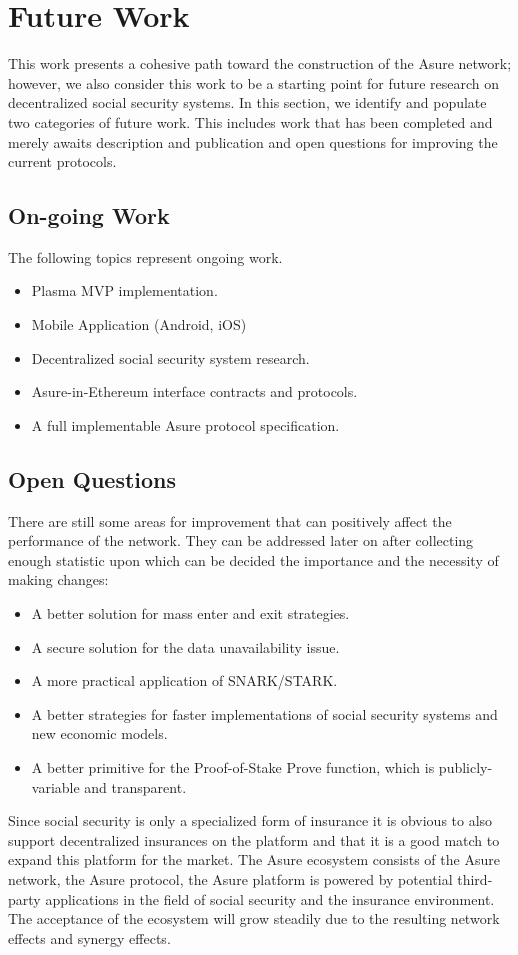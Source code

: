 \section{Future Work}

This work presents a cohesive path toward the construction of the Asure network; however, we also consider this work to be a starting point for future research on decentralized social security systems. In this section, we identify and populate two categories of future work. This includes work that has been completed and merely awaits description and publication and open questions for improving the current protocols.

\subsection{On-going Work}

The following topics represent ongoing work.

\begin{itemize}
\item Plasma MVP implementation.
\item Mobile Application (Android, iOS)
\item Decentralized social security system research.
\item Asure-in-Ethereum interface contracts and protocols.
\item A full implementable Asure protocol specification.
\end{itemize}

\subsection{Open Questions}
There are still some areas for improvement that can positively affect the performance of the network. They can be addressed later on after collecting enough statistic upon which can be decided the importance and the necessity of making changes:

\begin{itemize}
\item A better solution for mass enter and exit strategies.
\item A secure solution for the data unavailability issue.
\item A more practical application of SNARK/STARK.
\item A better strategies for faster implementations of social security systems and new economic models.
\item A better primitive for the Proof-of-Stake Prove function, which is publicly-variable and transparent.
\end{itemize}

Since social security is only a specialized form of insurance it is obvious to also support decentralized insurances on the platform and that it is a good match to expand this platform for the market. The Asure ecosystem consists of the Asure network, the Asure protocol, the Asure platform is powered by potential third-party applications in the field of social security and the insurance environment. The acceptance of the ecosystem will grow steadily due to the resulting network effects and synergy effects. 